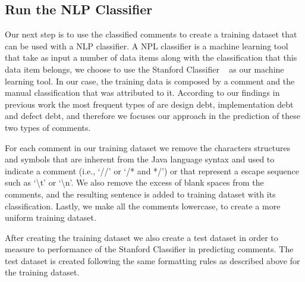 

\subsection{Run the NLP Classifier} %
\label{sub:run_the_nlp_classifier}


Our next step is to use the classified \SATD comments to create a training dataset that can be used with a NLP classifier. A NPL classifier is a machine learning tool that take as input a number of data items along with the classification that this data item belongs, we choose to use the Stanford Classifier ~\cite{Manning2014ACL} as our machine learning tool. In our case, the training data is composed by a comment and the manual classification that was attributed to it. According to our findings in previous work \cite{Maldonado2015MTD} the most frequent types of \SATD are design debt, implementation debt and defect debt, and therefore we focuses our approach in the prediction of these two types of \SATD comments.

For each comment in our training dataset we remove the characters structures and symbols that are inherent from the Java language syntax and used to indicate a comment (i.e., `//' or `/* and */') or that represent a escape sequence such as `\textbackslash t' or `\textbackslash n'. We also remove the excess of blank spaces from the comments, and the resulting sentence is added to training dataset with its classification. Lastly, we make all the comments lowercase, to create a more uniform training dataset.  

After creating the training dataset we also create a test dataset in order to measure to performance of the Stanford Classifier in predicting \SATD comments. The test dataset is created following the same formatting rules as described above for the training dataset. 

